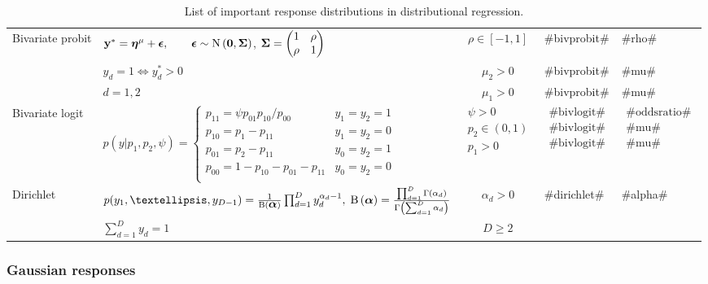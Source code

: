 \begin{table}
\begin{center}
\begin{tabular}{l l c l l}
Bivariate probit &$\mathbf{y}^\ast=\boldsymbol{\eta}^{\mu}+\mbox{\boldmath $\epsilon$}, \qquad \mbox{\boldmath $\epsilon$}\sim\mbox{N}\left(\boldsymbol{0},\mbox{\boldmath $\Sigma$}\right)$,
$\mbox{\boldmath $\Sigma$} = \left(\begin{matrix}
1 & \rho\\
\rho& 1\\
\end{matrix}\right)$&$\rho\in[-1,1]$&#bivprobit#&#rho#\\
&$y_{d}=1 \Longleftrightarrow y_{d}^\ast	> 0$&$\mu_2>0$&#bivprobit#&#mu#\\
&$d=1,2$&$\mu_1>0$&#bivprobit#&#mu#\\\hline
Bivariate logit & $p(y|p_1,p_2,\psi)=\begin{cases}
p_{11}=\psi p_{01}p_{10}/p_{00} & y_1=y_2=1\\p_{10}=p_1-p_{11} & y_1=y_2=0\\
p_{01}=p_2-p_{11} & y_0=y_2=1\\
p_{00}=1-p_{10}-p_{01}-p_{11} & y_0=y_2=0\\
 	\end{cases}$&$\begin{matrix} \psi>0\\p_2\in(0,1)\\p_1>0
 	\end{matrix}$ &$\begin{matrix} \text{#bivlogit#}\\\text{#bivlogit#}\\\text{#bivlogit#}
\end{matrix}$&$\begin{matrix} \text{#oddsratio#}\\\text{#mu#}\\\text{#mu#}
\end{matrix}$\\\hline
Dirichlet &$p(y_1,\ldots,y_{D-1}) = \frac{1}{\B(\alphavec)}\prod_{d=1}^{D}y_d^{\alpha_d-1},\;\B{(\alphavec)}=\frac{\prod_{d=1}^{D}\Gamma(\alpha_d)}{\Gamma\left(\sum_{d=1}^{D}\alpha_d\right)}$&$\alpha_d>0$&#dirichlet#&#alpha#\\	
&$\sum_{d=1}^D y_d = 1$&$D\geq 2$&&\\
\hline\hline
\end{tabular}
\end{center}\caption{\footnotesize List of important response distributions in distributional regression.}\label{tab:distrBayesX4}
\end{table}



\subsubsection*{Gaussian responses}


